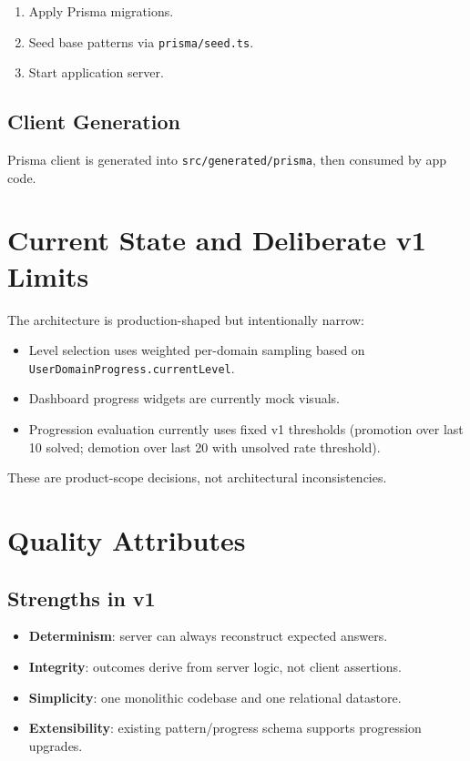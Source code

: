 \documentclass[11pt]{article}
\begin{document}
\begin{enumerate}[leftmargin=*]
	\item Apply Prisma migrations.
	\item Seed base patterns via \texttt{prisma/seed.ts}.
	\item Start application server.
\end{enumerate}

\subsection*{Client Generation}

Prisma client is generated into \texttt{src/generated/prisma}, then consumed by app code.

\section{Current State and Deliberate v1 Limits}

The architecture is production-shaped but intentionally narrow:

\begin{itemize}[leftmargin=*]
	\item Level selection uses weighted per-domain sampling based on \texttt{UserDomainProgress.currentLevel}.
	\item Dashboard progress widgets are currently mock visuals.
	\item Progression evaluation currently uses fixed v1 thresholds (promotion over last 10 solved; demotion over last 20 with unsolved rate threshold).
\end{itemize}

These are product-scope decisions, not architectural inconsistencies.

\section{Quality Attributes}

\subsection*{Strengths in v1}

\begin{itemize}[leftmargin=*]
	\item \textbf{Determinism}: server can always reconstruct expected answers.
	\item \textbf{Integrity}: outcomes derive from server logic, not client assertions.
	\item \textbf{Simplicity}: one monolithic codebase and one relational datastore.
	\item \textbf{Extensibility}: existing pattern/progress schema supports progression upgrades.
\end{itemize}
\end{document}
